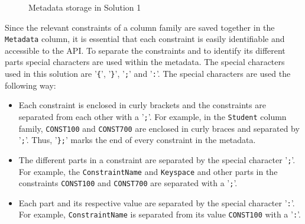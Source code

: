 		\begin{figure}[h] \label{fd:Metadata-Solution1}
			\centering
			\caption{Metadata storage in Solution 1}
		\end{figure}
Since the relevant constraints of a column family are saved
together in the \texttt{Metadata} column,  it is essential that each constraint
is easily identifiable and accessible to the \ac{API}.  To separate the constraints
and to identify its different parts special characters are used within the
metadata.  The special characters used in this solution are '\texttt{\{}', 
'\texttt{\}}', '\texttt{;}' and '\texttt{:}'.  The special characters are used the
following way:
	
		\begin{itemize}
			\item Each constraint is enclosed in curly brackets and the
			constraints are separated from each other with a
			'\texttt{;}'.  For example, in the \texttt{Student} column
			family,  \texttt{CONST100} and \texttt{CONST700} are enclosed in curly braces
			and separated by '\texttt{;}'. 
			Thus,  '\texttt{\};}' marks the end of every constraint in the metadata. 
		
		
			\item The different parts in a constraint are separated by the special character
			'\texttt{;}'.  For example,  the \texttt{ConstraintName}
			and \texttt{Keyspace} and other parts in the constraints \texttt{CONST100} and
						 \texttt{CONST700} are separated with a '\texttt{;}'. 
			 
			 
			\item Each part and its respective value are separated by the special
			character '\texttt{:}'.  For example,  \texttt{ConstraintName} is separated from
			its value \texttt{CONST100} with a '\texttt{:}'.  
			
		\end{itemize}
		
